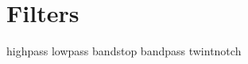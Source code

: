 \documentclass[12pt,a4paper]{article}
\begin{document}
\section*{Filters}
    {highpass}
    {lowpass}
    {bandstop}
    {bandpass}
    {twintnotch}
\end{document}
